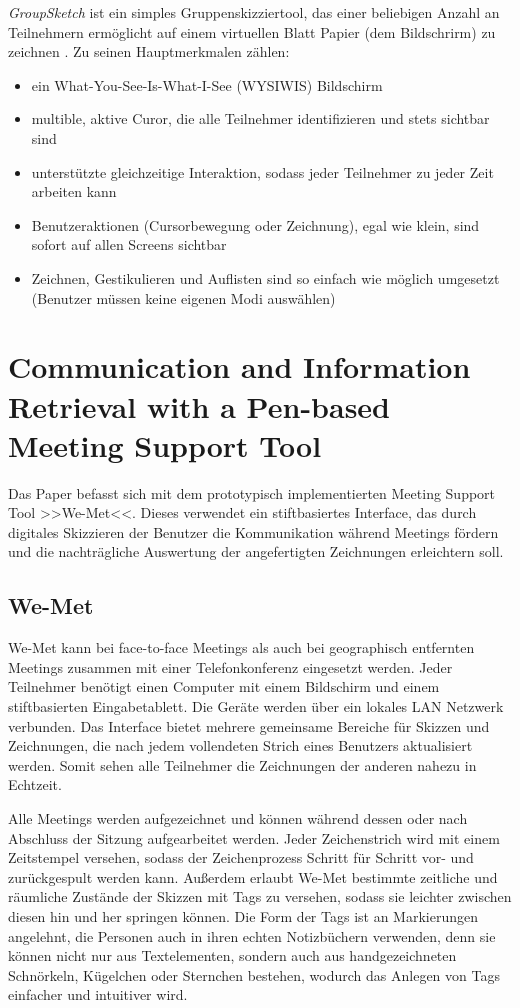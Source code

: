 \medskip \emph{GroupSketch} ist ein simples Gruppenskizziertool, das einer beliebigen Anzahl an Teilnehmern ermöglicht auf einem virtuellen Blatt Papier (dem Bildschrirm) zu zeichnen \cite{Greenberg:1991}. Zu seinen Hauptmerkmalen zählen:
\begin{itemize}
	\item{ein What-You-See-Is-What-I-See (WYSIWIS) Bildschirm}
	\item{multible, aktive Curor, die alle Teilnehmer identifizieren und stets sichtbar sind}
	\item{unterstützte gleichzeitige Interaktion, sodass jeder Teilnehmer zu jeder Zeit arbeiten kann}
	\item{Benutzeraktionen (Cursorbewegung oder Zeichnung), egal wie klein, sind sofort auf allen Screens sichtbar}
	\item{Zeichnen, Gestikulieren und Auflisten sind so einfach wie möglich umgesetzt (Benutzer müssen keine eigenen Modi auswählen)}
\end{itemize}


\section{Communication and Information Retrieval with a Pen-based Meeting Support Tool}
Das Paper befasst sich mit dem prototypisch implementierten Meeting Support Tool >>We-Met<<. Dieses verwendet ein stiftbasiertes Interface, das durch digitales Skizzieren der Benutzer die Kommunikation während Meetings fördern und die nachträgliche Auswertung der angefertigten Zeichnungen erleichtern soll.

\subsection{We-Met}
We-Met kann bei face-to-face Meetings als auch bei geographisch entfernten Meetings zusammen mit einer Telefonkonferenz eingesetzt werden. Jeder Teilnehmer benötigt einen Computer mit einem Bildschirm und einem stiftbasierten Eingabetablett. Die Geräte werden über ein lokales LAN Netzwerk verbunden. Das Interface bietet mehrere gemeinsame Bereiche für Skizzen und Zeichnungen, die nach jedem vollendeten Strich eines Benutzers aktualisiert werden. Somit sehen alle Teilnehmer die Zeichnungen der anderen nahezu in Echtzeit.

Alle Meetings werden aufgezeichnet und können während dessen oder nach Abschluss der Sitzung aufgearbeitet werden. Jeder Zeichenstrich wird mit einem Zeitstempel versehen, sodass der Zeichenprozess Schritt für Schritt vor- und zurückgespult werden kann. Außerdem erlaubt We-Met bestimmte zeitliche und räumliche Zustände der Skizzen mit Tags zu versehen, sodass sie leichter zwischen diesen hin und her springen können. Die Form der Tags ist an Markierungen angelehnt, die Personen auch in ihren echten Notizbüchern verwenden, denn sie können nicht nur aus Textelementen, sondern auch aus handgezeichneten Schnörkeln, Kügelchen oder Sternchen bestehen, wodurch das Anlegen von Tags einfacher und intuitiver wird.


